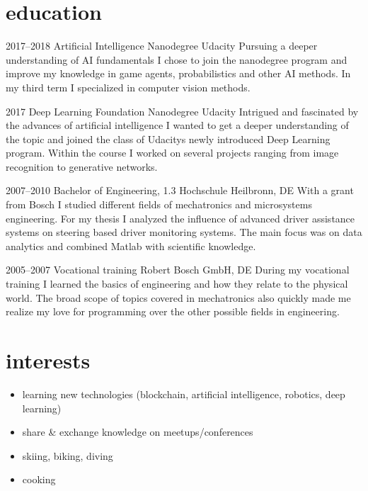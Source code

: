 \documentclass[]{friggeri-cv} %
\begin{document}
\section{\color{blue}education}

\begin{entrylist}

\entry
{2017--2018}
{Artificial Intelligence {\normalfont Nanodegree}}
{Udacity}
{Pursuing a deeper understanding of AI fundamentals I chose to join the nanodegree program and improve my knowledge in game agents, probabilistics and other AI methods. In my third term I specialized in computer vision methods.}

\entry
{2017}
{Deep Learning {\normalfont Foundation Nanodegree}}
{Udacity}
{Intrigued and fascinated by the advances of artificial intelligence I wanted to get a deeper understanding of the topic and joined the class of Udacitys newly introduced Deep Learning program. Within the course I worked on several projects ranging from image recognition to generative networks.}

\entry
{2007--2010}
{Bachelor {\normalfont of Engineering,} 1.3}
{Hochschule Heilbronn, DE}
{With a grant from Bosch I studied different fields of mechatronics and microsystems engineering. For my thesis I analyzed the influence of advanced driver assistance systems on steering based driver monitoring systems. The main focus was on data analytics and combined Matlab with scientific knowledge.
}

\entry
{2005--2007}
{Vocational training}
{Robert Bosch GmbH, DE}
{During my vocational training I learned the basics of engineering and how they relate to the physical world. The broad scope of topics covered in mechatronics also quickly made me realize my love for programming over the other possible fields in engineering.
}
\end{entrylist}


\section{\color{green}interests}
\begin{itemize}
\item learning new technologies (blockchain, artificial intelligence, robotics, deep learning)
\item share \& exchange knowledge on meetups/conferences
\item skiing, biking, diving
\item cooking
\end{itemize}
\end{document}
